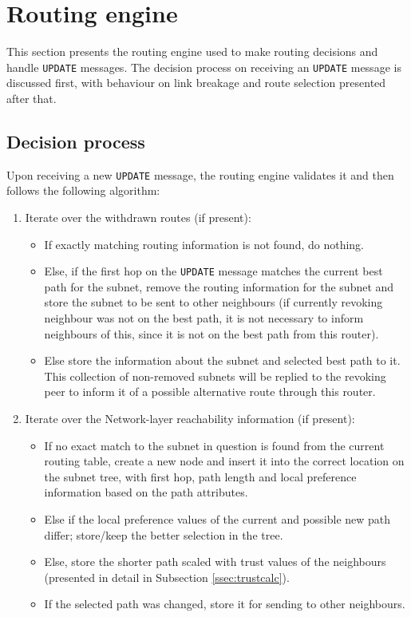 \documentclass[11pt,a4paper,titlepage]{report}
\begin{document}
\section{Routing engine}\label{sec:routing}
This section presents the routing engine used to make routing decisions and handle \texttt{UPDATE} messages. The decision process on receiving an \texttt{UPDATE} message is discussed first, with behaviour on link breakage and route selection presented after that.

\subsection{Decision process}\label{ssec:decision}
Upon receiving a new \texttt{UPDATE} message, the routing engine validates it and then follows the following algorithm:
\begin{enumerate}
\item Iterate over the withdrawn routes (if present):
	\begin{itemize}
	\item If exactly matching routing information is not found, do nothing.
	\item Else, if the first hop on the \texttt{UPDATE} message matches the current best path for the subnet, remove the routing information for the subnet and store the subnet to be sent to other neighbours (if currently revoking neighbour was not on the best path, it is not necessary to inform neighbours of this, since it is not on the best path from this router).
	\item Else store the information about the subnet and selected best path to it. This collection of non-removed subnets will be replied to the revoking peer to inform it of a possible alternative route through this router.
	\end{itemize}

\item Iterate over the Network-layer reachability information (if present):
	\begin{itemize}
	\item If no exact match to the subnet in question is found from the current routing table, create a new node and insert it into the correct location on the subnet tree, with first hop, path length and local preference information based on the path attributes.
	\item Else if the local preference values of the current and possible new path differ; store/keep the better selection in the tree.
	\item Else, store the shorter path scaled with trust values of the neighbours (presented in detail in Subsection \ref{ssec:trustcalc}).
	\item If the selected path was changed, store it for sending to other neighbours.
	\end{itemize}
	

\end{enumerate}
\end{document}
